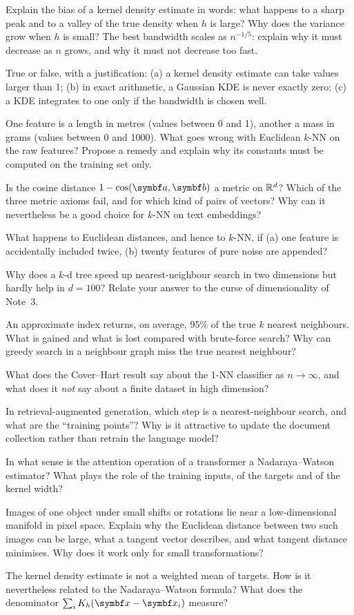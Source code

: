 \documentclass[11pt]{article}
\begin{document}
\begin{questions}
\begin{conceptual}
\item Explain the bias of a kernel density estimate in words: what happens to a sharp peak and to a valley of the
true density when $h$ is large? Why does the variance grow when $h$ is small? The best bandwidth scales as
$n^{-1/5}$: explain why it must decrease as $n$ grows, and why it must not decrease too fast.
\item True or false, with a justification: (a) a kernel density estimate can take values larger than 1; (b) in exact
arithmetic, a Gaussian KDE is never exactly zero; (c) a KDE integrates to one only if the bandwidth is chosen well.
\item One feature is a length in metres (values between 0 and 1), another a mass in grams (values between 0 and
1000). What goes wrong with Euclidean $k$-NN on the raw features? Propose a remedy and explain why its constants must
be computed on the training set only.
\item Is the cosine distance $1 - \cos(\vect{a}, \vect{b})$ a metric on $\mathbb{R}^d$? Which of the three metric axioms
fail, and for which kind of pairs of vectors? Why can it nevertheless be a good choice for $k$-NN on text
embeddings?
\item What happens to Euclidean distances, and hence to $k$-NN, if (a) one feature is accidentally included twice,
(b) twenty features of pure noise are appended?
\item Why does a $k$-d tree speed up nearest-neighbour search in two dimensions but hardly help in $d = 100$? Relate
your answer to the curse of dimensionality of Note~3.
\item An approximate index returns, on average, 95\% of the true $k$ nearest neighbours. What is gained and what is
lost compared with brute-force search? Why can greedy search in a neighbour graph miss the true nearest neighbour?
\item What does the Cover--Hart result say about the 1-NN classifier as $n \to \infty$, and what does it \emph{not}
say about a finite dataset in high dimension?
\item In retrieval-augmented generation, which step is a nearest-neighbour search, and what are the ``training
points''? Why is it attractive to update the document collection rather than retrain the language model?
\item In what sense is the attention operation of a transformer a Nadaraya--Watson estimator? What plays the role of
the training inputs, of the targets and of the kernel width?
\item Images of one object under small shifts or rotations lie near a low-dimensional manifold in pixel space.
Explain why the Euclidean distance between two such images can be large, what a tangent vector describes, and what
tangent distance minimises. Why does it work only for small transformations?
\item The kernel density estimate is not a weighted mean of targets. How is it nevertheless related to the
Nadaraya--Watson formula? What does the denominator $\sum_i K_h(\x - \x_i)$ measure?
\end{conceptual}


\end{questions}
\end{document}

